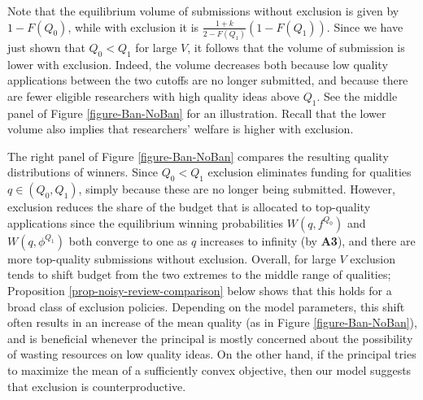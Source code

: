 \documentclass[12pt]{article}
\theoremstyle{plain}
\theoremstyle{definition}
\newtheorem{remark}{Remark}
\theoremstyle{remark}
\begin{document}

Note that the equilibrium volume of submissions without exclusion is given by $1-F(Q_0)$, while with exclusion it is $\frac{1+k}{2-F(Q_1)}(1-F(Q_1))$. Since we have just shown that $Q_0<Q_1$ for large $V$, it follows that the volume of submission is lower with exclusion. Indeed, the volume decreases both because low quality applications between the two cutoffs are no longer submitted, and because there are fewer eligible researchers with high quality ideas above $Q_1$. See the middle panel of Figure \ref{figure-Ban-NoBan} for an illustration. Recall that the lower volume also implies that researchers' welfare is higher with exclusion.
  

The right panel of Figure \ref{figure-Ban-NoBan} compares the resulting quality distributions of winners. Since $Q_0<Q_1$ exclusion eliminates funding for qualities $q\in (Q_0,Q_1)$, simply because these are no longer being submitted. However, exclusion reduces the share of the budget that is allocated to top-quality applications since the equilibrium winning probabilities $W(q,f^{Q_0})$ and $W(q,\phi^{Q_1})$ both converge to one as $q$ increases to infinity (by \textbf{A3}), and there are more top-quality submissions without exclusion. Overall, for large $V$ exclusion tends to shift budget from the two extremes to the middle range of qualities; Proposition \ref{prop-noisy-review-comparison} below shows that this holds for a broad class of exclusion policies. Depending on the model parameters, this shift often results in an increase of the mean quality (as in Figure \ref{figure-Ban-NoBan}), and is beneficial whenever the principal is mostly concerned about the possibility of wasting resources on low quality ideas. On the other hand, if the principal tries to maximize the mean of a sufficiently convex objective, then our model suggests that exclusion is counterproductive.
\end{document}
